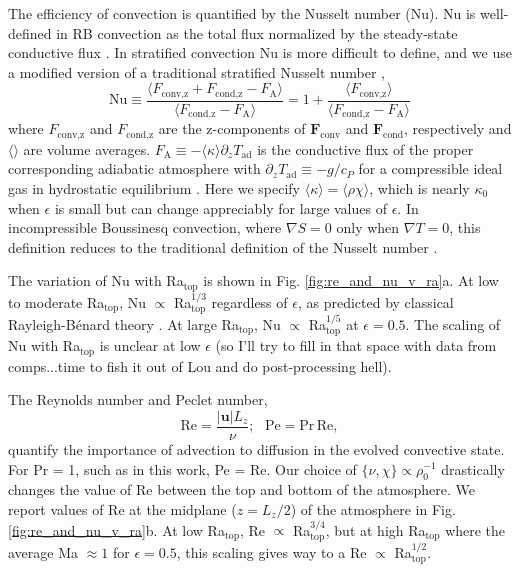 \documentclass[aps, prl, twocolumn, nofootinbib, groupedaddress, amsfonts, amssymb, amsmath]{revtex4-1}
\newcommand{\grad}{\ensuremath{\nabla}}
\newcommand{\RB}{Rayleigh-B\'{e}nard }
\begin{document}
The efficiency of convection is quantified by the Nusselt number (Nu).  
Nu is well-defined in RB convection
as the total flux normalized by the steady-state conductive flux 
\cite{johnston&doering2009, otero&all2002}.
In stratified convection Nu is more difficult to define, and we use
a modified version of a traditional stratified Nusselt number 
\cite{graham1975,hurlburt&all1984},
\begin{equation}
\text{Nu} \equiv \frac{\langle F_{\text{conv,z}} + F_{\text{cond,z}} - F_{\text{A}}\rangle}
{\langle F_{\text{cond,z}} - F_{\text{A}}\rangle} 
= 1 + \frac{\langle F_{\text{conv,z}}\rangle}{\langle F_{\text{cond,z}} - F_{\text{A}} \rangle}
\label{eqn:nusselt}
\end{equation}
where $F_{\text{conv,z}}$ and $F_{\text{cond,z}}$ are the 
z-components of $\bm{F}_{\text{conv}}$ and $\bm{F}_{\text{cond}}$,
respectively and $\langle \rangle$ are volume averages.  
$F_{\text{A}} \equiv -\langle\kappa\rangle \partial_z T_{\text{ad}}$ 
is the conductive flux of the proper corresponding adiabatic atmosphere
with $\partial_z T_{\text{ad}} \equiv - g / c_{P}$ 
for a compressible ideal gas in hydrostatic equilibrium \cite{spiegel&veronis1960}.  Here we specify
$\langle \kappa \rangle = \langle \rho\chi \rangle$, which is nearly
$\kappa_0$ when $\epsilon$ is small but can change appreciably for large
values of $\epsilon$.
In incompressible Boussinesq convection, where $\grad S = 0$ only when 
$\grad T = 0$, this definition reduces to the traditional definition
of the Nusselt number \cite{otero&all2002, johnston&doering2009}.

The variation of Nu with Ra$_{\text{top}}$ is shown in 
Fig. \ref{fig:re_and_nu_v_ra}a.
At low to moderate Ra$_{\text{top}}$, 
Nu $\propto$ Ra$_{\text{top}}^{1/3}$ regardless of $\epsilon$,
as predicted by classical \RB theory \cite{king&all2012}.
At large Ra$_{\text{top}}$, Nu $\propto$ Ra$_{\text{top}}^{1/5}$ 
at $\epsilon = 0.5$.
The scaling of Nu with Ra$_{\text{top}}$ 
is unclear at low $\epsilon$ (so I'll try to fill in that space with
data from comps...time to fish it out of Lou and do post-processing hell).

The Reynolds number and Peclet number,
\begin{equation}
\text{Re} = \frac{|\bm{u}| L_z}{\nu};\,\,\,\,\text{Pe} = \text{Pr}\,\text{Re},
\end{equation}
quantify the importance of advection to diffusion in the evolved
convective state.  For Pr = 1, such as in this work, Pe = Re.  
Our choice of $\{\nu,\chi\}\propto \rho_0^{-1}$ drastically changes
the value of Re between the top and bottom of the atmosphere.  We report values of
Re at the midplane ($z=L_z/2$) of the atmosphere in
Fig. \ref{fig:re_and_nu_v_ra}b.
At low Ra$_{\text{top}}$, Re $\propto$ Ra$_{\text{top}}^{3/4}$, but at high 
Ra$_{\text{top}}$ where the average Ma $\approx 1$ for $\epsilon = 0.5$, 
this scaling gives way to a Re $\propto$ Ra$_{\text{top}}^{1/2}$.
\end{document}
